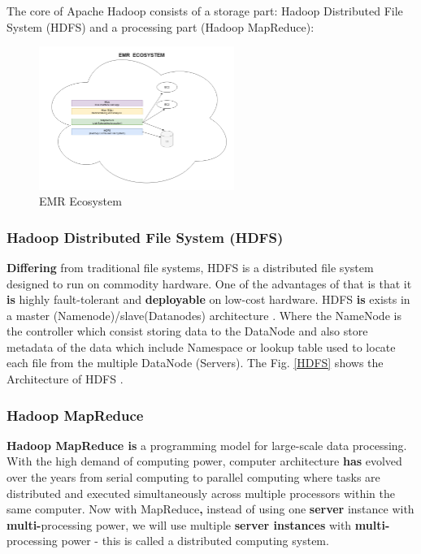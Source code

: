 \documentclass[journal]{IEEEtran}
\begin{document}
	The core of Apache Hadoop consists of a storage part: Hadoop Distributed File System (HDFS) and a processing part (Hadoop MapReduce):
	
	\begin{figure}
		\centering
		\includegraphics[width=2.5in]{EMR_Ecosystem.png}
		\caption{EMR Ecosystem}
		\label{EMR}
	\end{figure}
	
	\subsubsection{Hadoop Distributed File System (HDFS)}
	
	\textbf{Differing} from traditional file systems, HDFS is a distributed file system designed to run on commodity hardware. One of the advantages of that is that it \textbf{is} highly fault-tolerant and \textbf{deployable} on low-cost hardware. HDFS \textbf{is} exists in a master (Namenode)/slave(Datanodes) architecture . Where the NameNode is the controller which consist storing data to the DataNode and also store metadata of the data which include Namespace or lookup table used to locate each file from the multiple DataNode (Servers). The Fig. \ref{HDFS} shows the Architecture of HDFS \cite{HDFS}.
	
	\subsubsection{Hadoop MapReduce}
	
	\textbf{Hadoop MapReduce is} a programming model for large-scale data processing. With the high demand of computing power, computer architecture \textbf{has} evolved over the years from serial computing to parallel computing where tasks are distributed and executed simultaneously across multiple processors within the same computer. Now with MapReduce\textbf{,} instead of using one \textbf{server} instance with \textbf{multi-}processing power, we will use multiple \textbf{server instances} with \textbf{multi-}processing power - this is called a distributed computing system.
	
\end{document}
